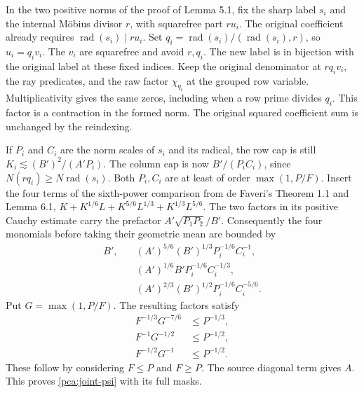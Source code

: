 In the two positive norms of the proof of Lemma 5.1,
fix the sharp label \(s_i\) and the internal Möbius
divisor \(r\), with squarefree part \(r u_i\).
The original coefficient already requires
\(\operatorname{rad}(s_i)\mid r u_i\).
Set \(q_i=\operatorname{rad}(s_i)/(\operatorname{rad}(s_i),r)\),
so \(u_i=q_i v_i\). The \(v_i\) are squarefree and avoid \(r,q_i\).
The new label is in bijection with the original label at
these fixed indices. Keep the original denominator at
\(r q_i v_i\), the ray predicates, and the raw factor
\(\chi_{q_i}\) at the grouped row variable. Multiplicativity
gives the same zeros, including when a row prime divides
\(q_i\). This factor is a contraction in the formed norm.
The original squared coefficient sum is unchanged by the reindexing.

If \(P_i\) and \(C_i\) are the norm scales of \(s_i\) and
its radical, the row cap is still \(K_i\lesssim (B')^2/(A'P_i)\).
The column cap is now \(B'/(P_i C_i)\), since
\(N(rq_i)\ge N\operatorname{rad}(s_i)\).
Both \(P_i,C_i\) are at least of order \(\max(1,P/F)\).
Insert the four terms of the sixth-power comparison from
de Faveri's Theorem 1.1 and Lemma 6.1,
\(K+K^{1/6}L+K^{5/6}L^{1/3}+K^{1/3}L^{5/6}\).
The two factors in its positive Cauchy estimate carry
the prefactor \(A'\sqrt{P_1P_2}/B'\). Consequently
the four monomials before taking their geometric mean
are bounded by
\[
 \begin{aligned}
 B',\quad &(A')^{5/6}(B')^{1/3}P_i^{-1/6}C_i^{-1},\\
 &(A')^{1/6}B'P_i^{-1/6}C_i^{-1/3},\\
 &(A')^{2/3}(B')^{1/2}P_i^{-1/6}C_i^{-5/6}.
 \end{aligned}
\]
Put \(G=\max(1,P/F)\). The resulting factors satisfy
\[
 \begin{aligned}
 F^{-1/3}G^{-7/6}&\le P^{-1/3},\\
 F^{-1}G^{-1/2}&\le P^{-1/2},\\
 F^{-1/2}G^{-1}&\le P^{-1/2}.
 \end{aligned}
\]
These follow by considering \(F\le P\) and
\(F\ge P\). The source diagonal term gives \(A\).
This proves \eqref{pca:joint-psi} with its full masks.

